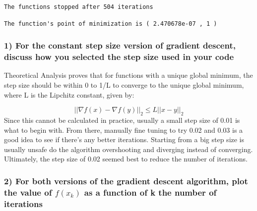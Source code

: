 \documentclass[
  letterpaper,
  DIV=11,
  numbers=noendperiod]{scrartcl}
\newenvironment{Shaded}{\begin{snugshade}}{\end{snugshade}}
\newcommand{\FunctionTok}[1]{\textcolor[rgb]{0.28,0.35,0.67}{#1}}
\newcommand{\NormalTok}[1]{\textcolor[rgb]{0.00,0.23,0.31}{#1}}
\newcommand{\SpecialCharTok}[1]{\textcolor[rgb]{0.37,0.37,0.37}{#1}}
\newcommand{\StringTok}[1]{\textcolor[rgb]{0.13,0.47,0.30}{#1}}
\begin{document}
\begin{verbatim}
The functions stopped after 504 iterations 
\end{verbatim}

\begin{Shaded}
\end{Shaded}

\begin{verbatim}
The function's point of minimization is ( 2.470678e-07 , 1 ) 
\end{verbatim}

\subsubsection{1) For the constant step size version of gradient
descent, discuss how you selected the step size used in your
code}\label{for-the-constant-step-size-version-of-gradient-descent-discuss-how-you-selected-the-step-size-used-in-your-code}

Theoretical Analysis proves that for functions with a unique global
minimum, the step size should be within 0 to 1/L to converge to the
unique global minimum, where L is the Lipchitz constant, given by:

\[
||∇f(x) - ∇f(y)||_2 \le L||x - y||_2
\] Since this cannot be calculated in practice, usually a small step
size of 0.01 is what to begin with. From there, manually fine tuning to
try 0.02 and 0.03 is a good idea to see if there's any better
iterations. Starting from a big step size is usually unsafe do the
algorithm overshooting and diverging instead of converging. Ultimately,
the step size of 0.02 seemed best to reduce the number of iterations.

\subsubsection{\texorpdfstring{2) For both versions of the gradient
descent algorithm, plot the value of \(f(x_k)\) as a function of k the
number of
iterations}{2) For both versions of the gradient descent algorithm, plot the value of f(x\_k) as a function of k the number of iterations}}\label{for-both-versions-of-the-gradient-descent-algorithm-plot-the-value-of-fx_k-as-a-function-of-k-the-number-of-iterations}
\end{document}
